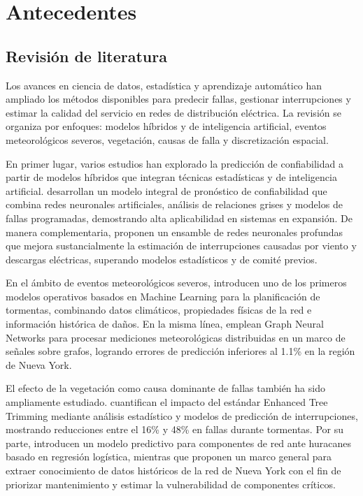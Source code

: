 \section{Antecedentes}
\label{sec:antecedentes}

\subsection{Revisión de literatura}

Los avances en ciencia de datos, estadística y aprendizaje automático han ampliado los métodos disponibles para predecir fallas, gestionar interrupciones y estimar la calidad del servicio en redes de distribución eléctrica. La revisión se organiza por enfoques: modelos híbridos y de inteligencia artificial, eventos meteorológicos severos, vegetación, causas de falla y discretización espacial.

En primer lugar, varios estudios han explorado la predicción de confiabilidad a partir de modelos híbridos que integran técnicas estadísticas y de inteligencia artificial. \textcite{ref11} desarrollan un modelo integral de pronóstico de confiabilidad que combina redes neuronales artificiales, análisis de relaciones grises y modelos de fallas programadas, demostrando alta aplicabilidad en sistemas en expansión. De manera complementaria, \textcite{ref12} proponen un ensamble de redes neuronales profundas que mejora sustancialmente la estimación de interrupciones causadas por viento y descargas eléctricas, superando modelos estadísticos y de comité previos.

En el ámbito de eventos meteorológicos severos, \textcite{ref13} introducen uno de los primeros modelos operativos basados en Machine Learning para la planificación de tormentas, combinando datos climáticos, propiedades físicas de la red e información histórica de daños. En la misma línea, \textcite{ref14} emplean Graph Neural Networks para procesar mediciones meteorológicas distribuidas en un marco de señales sobre grafos, logrando errores de predicción inferiores al 1.1\% en la región de Nueva York.

El efecto de la vegetación como causa dominante de fallas también ha sido ampliamente estudiado. \textcite{ref15} cuantifican el impacto del estándar Enhanced Tree Trimming mediante análisis estadístico y modelos de predicción de interrupciones, mostrando reducciones entre el 16\% y 48\% en fallas durante tormentas. Por su parte, \textcite{ref16} introducen un modelo predictivo para componentes de red ante huracanes basado en regresión logística, mientras que \textcite{ref17} proponen un marco general para extraer conocimiento de datos históricos de la red de Nueva York con el fin de priorizar mantenimiento y estimar la vulnerabilidad de componentes críticos.

